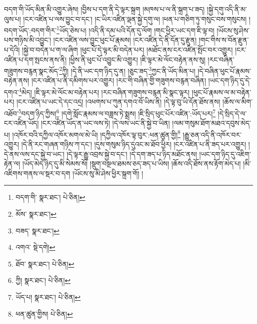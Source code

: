 བདག་གི་ཡོད་མིན་མི་འགྱུར་ཞེས། །བྱིས་པ་དག་ནི་དེ་ལྟར་སྐྲག །མཁས་པ་ལ་ནི་སྐྲག་པ་ཟད། །སྐྱེ་དགུ་འདི་ནི་མ་ལུས་པ། །ངར་འཛིན་པ་ལས་བྱུང་བ་དང་། །ང་ཡིར་འཛིན་ལྡན་སྐྱེ་དགུ་ལ། །ཕན་པ་གཅིག་ཏུ་གསུང་བས་གསུངས། །བདག་ཡོད་:བདག་གིར་\footnote{བདག་གི་  སྣར་ཐང་།  པེ་ཅིན། }ཡོད་ཅེས་པ། །འདི་ནི་དམ་པའི་དོན་དུ་ལོག །གང་ཕྱིར་ཡང་དག་ཇི་ལྟ་བ། །ཡོངས་སུ་ཤེས་པས་གཉིས་མི་འབྱུང་། །ངར་འཛིན་ལས་བྱུང་ཕུང་པོ་རྣམས། །ངར་འཛིན་དེ་ནི་དོན་དུ་རྫུན། །གང་གིས་ས་བོན་རྫུན་པ་དེའི། །སྐྱེ་བ་བདེན་པ་ག་ལ་ཞིག །ཕུང་པོ་དེ་ལྟར་མི་བདེན་པར། །མཐོང་ནས་ངར་འཛིན་སྤོང་བར་འགྱུར། །ངར་འཛིན་པ་དག་སྤངས་ནས་ནི། །ཕྱིས་ནི་ཕུང་པོ་འབྱུང་མི་འགྱུར། །ཇི་ལྟར་མེ་ལོང་བརྟེན་ནས་སུ། །རང་བཞིན་གཟུགས་བརྙན་སྣང་མོད་\footnote{མོས་  སྣར་ཐང་། }ཀྱི། །དེ་ནི་ཡང་དག་ཉིད་དུ་ན། །ཅུང་ཟད་\footnote{བཟད་  སྣར་ཐང་། }ཀྱང་ནི་ཡོད་མིན་པ། །དེ་བཞིན་ཕུང་པོ་རྣམས་བརྟེན་ནས། །ངར་འཛིན་པ་ནི་དམིགས་པར་འགྱུར། །རང་གི་བཞིན་གྱི་གཟུགས་བརྙན་བཞིན། །ཡང་དག་ཉིད་དུ་དེ་དགའ་\footnote{འགའ་  སྡེ་དགེ། }མེད། །ཇི་ལྟར་མེ་ལོང་མ་བརྟེན་པར། །རང་བཞིན་གཟུགས་བརྙན་མི་སྣང་ལྟར། །ཕུང་པོ་རྣམས་ལ་མ་བརྟེན་པར། །ངར་འཛིན་པ་ཡང་དེ་དང་འདྲ། །འཕགས་པ་ཀུན་དགའ་བོ་ཡིས་ནི། །དེ་ལྟ་བུ་ཡི་དོན་ཐོས་ནས། །ཆོས་ལ་མིག་འཐོབ་\footnote{ཐོབ་  སྣར་ཐང་།  པེ་ཅིན། }བདག་ཉིད་ཀྱིས།\footnote{ཀྱི།  སྣར་ཐང་།  པེ་ཅིན། } །དགེ་སློང་རྣམས་ལ་བཟླས་ཏེ་སྨྲས། །ཇི་སྲིད་ཕུང་པོར་འཛིན་:ཡོད་པར།\footnote{ཡོད་པ།  སྣར་ཐང་།  པེ་ཅིན། } །དེ་སྲིད་དེ་ལ་ངར་འཛིན་ཡོད། །ངར་འཛིན་ཡོད་ན་ཡང་ལས་ཏེ། །དེ་ལས་ཡང་ནི་སྐྱེ་བ་ཡིན། །ལམ་གསུམ་ཐོག་མཐའ་དབུས་མེད་པ། །འཁོར་བའི་དཀྱིལ་འཁོར་མགལ་མེ་ཡི། །དཀྱིལ་འཁོར་ལྟ་བུར་:ཕན་ཚུན་གྱི།\footnote{ཕན་ཚུན་གྱིས།  པེ་ཅིན། } །རྒྱུ་ཅན་འདི་ནི་འཁོར་བར་འགྱུར། །དེ་ནི་རང་གཞན་གཉིས་ཀ་དང་། །དུས་གསུམ་ཉིད་དུའང་མ་ཐོབ་ཕྱིར། །ངར་འཛིན་པ་ནི་ཟད་པར་འགྱུར། །དེ་ནས་ལས་དང་སྐྱེ་བ་ཡང་། །དེ་ལྟར་རྒྱུ་འབྲས་སྐྱེ་བ་དང་། །དེ་དག་ཟད་པ་ཉིད་མཐོང་ནས། །ཡང་དག་ཉིད་དུ་འཇིག་རྟེན་ལ། །ཡོད་མེད་ཉིད་དུ་མི་སེམས་སོ། །སྡུག་བསྔལ་ཐམས་ཅད་ཟད་པ་ཡིས། །ཆོས་འདི་ཐོས་ནས་རྟོག་མེད་པ། །མི་འཇིགས་གནས་ལ་སྡར་བ་དག །ཡོངས་སུ་མི་ཤེས་ཕྱིར་སྐྲག་གོ། །
